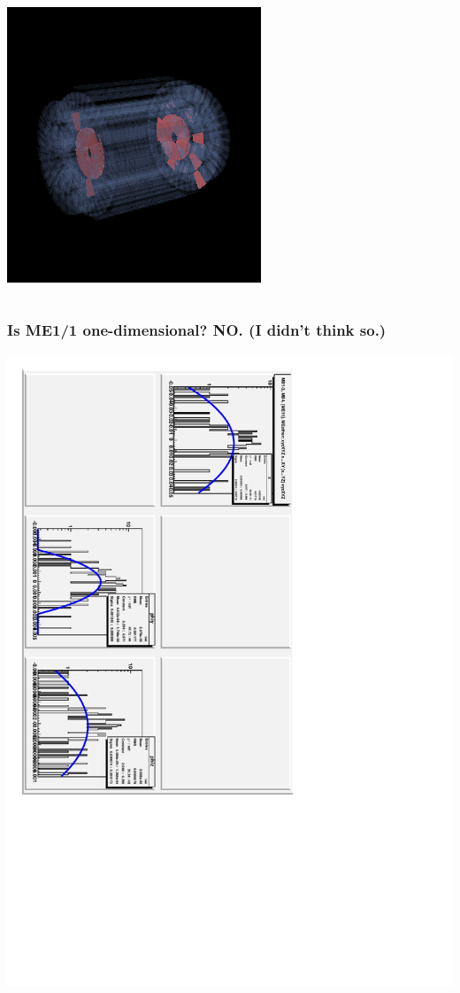 \documentclass[compress]{beamer}
\begin{document}
\begin{frame}
\begin{columns}
\includegraphics[width=\linewidth]{wierd_bump_locations2.png}
\end{columns}
\end{frame}

\begin{frame}
\frametitle{Is ME1/1 one-dimensional?  NO.  (I didn't think so.)}
\includegraphics[height=\linewidth, angle=90]{optimized_tight_endcapme11.pdf}
\end{frame}
\end{document}
